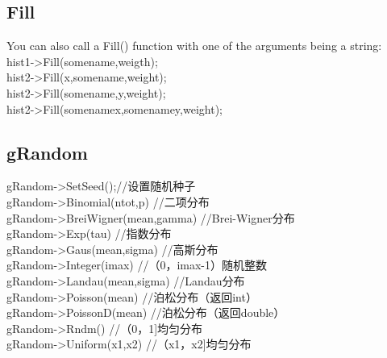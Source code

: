 \documentclass[11pt,a4paper,titlepage]{article}
\begin{document}
{\subsection{Fill} %
You can also call a Fill() function with one of the arguments being a string:\\
hist1->Fill(somename,weigth);\\
hist2->Fill(x,somename,weight);\\
hist2->Fill(somename,y,weight);\\
hist2->Fill(somenamex,somenamey,weight);\\

\subsection{gRandom} %
gRandom->SetSeed();//设置随机种子\\
gRandom->Binomial(ntot,p)       //二项分布\\
gRandom->BreiWigner(mean,gamma) //Brei-Wigner分布\\
gRandom->Exp(tau)               //指数分布\\
gRandom->Gaus(mean,sigma)       //高斯分布\\
gRandom->Integer(imax)          //（0，imax-1）随机整数\\
gRandom->Landau(mean,sigma)     //Landau分布\\
gRandom->Poisson(mean)          //泊松分布（返回int）\\
gRandom->PoissonD(mean)         //泊松分布（返回double）\\
gRandom->Rndm()                 //（0，1]均匀分布\\
gRandom->Uniform(x1,x2)         //（x1，x2]均匀分布\\

}
\end{document}
